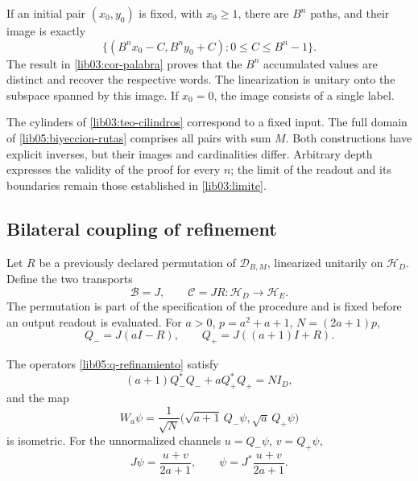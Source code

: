If an initial pair \((x_0,y_0)\) is fixed, with \(x_0\geq1\),
there are \(B^n\) paths, and their image is exactly
\begin{equation}
 \bigl\{(B^nx_0-C,B^ny_0+C):0\leq C\leq B^n-1\bigr\}.
 \label{lib05:imagen-fija}
\end{equation}
The result in \cref{lib03:cor-palabra} proves that the \(B^n\)
accumulated values are distinct and recover the respective words. The
linearization is unitary onto the subspace spanned by this
image. If \(x_0=0\), the image consists of a single label.

The cylinders of \cref{lib03:teo-cilindros} correspond to a
fixed input. The full domain of
\eqref{lib05:biyeccion-rutas} comprises all pairs with sum \(M\).
Both constructions have explicit inverses, but their images
and cardinalities differ. Arbitrary depth expresses the
validity of the proof for every \(n\); the limit of the readout and
its boundaries remain those established in
\cref{lib03:limite}.

\subsection{Bilateral coupling of refinement}
\label{lib05:bilateral}

Let \(R\) be a previously declared permutation of
\(\mathcal D_{B,M}\), linearized unitarily on
\(\mathscr H_D\). Define the two transports
\begin{equation}
 \mathcal B=J,\qquad \mathcal C=JR:
            \mathscr H_D\longrightarrow\mathscr H_E.
 \label{lib05:dos-transportes}
\end{equation}
The permutation is part of the specification of the procedure
and is fixed before an output readout is evaluated.
For \(a>0\), \(p=a^2+a+1\), \(N=(2a+1)p\),
\begin{equation}
 Q_-=J(aI-R),\qquad Q_+=J((a+1)I+R).
 \label{lib05:q-refinamiento}
\end{equation}

\begin{proposition}
\label{lib05:prop-bilateral}
The operators \eqref{lib05:q-refinamiento} satisfy
\begin{equation}
 (a+1)Q_-^*Q_-+aQ_+^*Q_+=NI_D,
 \label{lib05:balance}
\end{equation}
and the map
\begin{equation}
 W_a\psi=\frac1{\sqrt N}
    \bigl(\sqrt{a+1}\,Q_-\psi,\sqrt a\,Q_+\psi\bigr)
 \label{lib05:w}
\end{equation}
is isometric. For the unnormalized channels
\(u=Q_-\psi\), \(v=Q_+\psi\),
\begin{equation}
 J\psi=\frac{u+v}{2a+1},\qquad
 \psi=J^*\frac{u+v}{2a+1}.
 \label{lib05:inversa-bilateral}
\end{equation}
\end{proposition}

